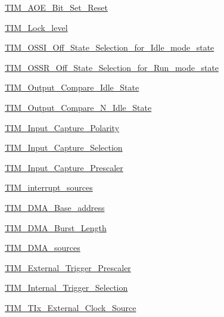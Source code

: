 \begin{DoxyCompactItemize}
\item 
\hyperlink{group___t_i_m___a_o_e___bit___set___reset}{T\+I\+M\+\_\+\+A\+O\+E\+\_\+\+Bit\+\_\+\+Set\+\_\+\+Reset}
\item 
\hyperlink{group___t_i_m___lock__level}{T\+I\+M\+\_\+\+Lock\+\_\+level}
\item 
\hyperlink{group___t_i_m___o_s_s_i___off___state___selection__for___idle__mode__state}{T\+I\+M\+\_\+\+O\+S\+S\+I\+\_\+\+Off\+\_\+\+State\+\_\+\+Selection\+\_\+for\+\_\+\+Idle\+\_\+mode\+\_\+state}
\item 
\hyperlink{group___t_i_m___o_s_s_r___off___state___selection__for___run__mode__state}{T\+I\+M\+\_\+\+O\+S\+S\+R\+\_\+\+Off\+\_\+\+State\+\_\+\+Selection\+\_\+for\+\_\+\+Run\+\_\+mode\+\_\+state}
\item 
\hyperlink{group___t_i_m___output___compare___idle___state}{T\+I\+M\+\_\+\+Output\+\_\+\+Compare\+\_\+\+Idle\+\_\+\+State}
\item 
\hyperlink{group___t_i_m___output___compare___n___idle___state}{T\+I\+M\+\_\+\+Output\+\_\+\+Compare\+\_\+\+N\+\_\+\+Idle\+\_\+\+State}
\item 
\hyperlink{group___t_i_m___input___capture___polarity}{T\+I\+M\+\_\+\+Input\+\_\+\+Capture\+\_\+\+Polarity}
\item 
\hyperlink{group___t_i_m___input___capture___selection}{T\+I\+M\+\_\+\+Input\+\_\+\+Capture\+\_\+\+Selection}
\item 
\hyperlink{group___t_i_m___input___capture___prescaler}{T\+I\+M\+\_\+\+Input\+\_\+\+Capture\+\_\+\+Prescaler}
\item 
\hyperlink{group___t_i_m__interrupt__sources}{T\+I\+M\+\_\+interrupt\+\_\+sources}
\item 
\hyperlink{group___t_i_m___d_m_a___base__address}{T\+I\+M\+\_\+\+D\+M\+A\+\_\+\+Base\+\_\+address}
\item 
\hyperlink{group___t_i_m___d_m_a___burst___length}{T\+I\+M\+\_\+\+D\+M\+A\+\_\+\+Burst\+\_\+\+Length}
\item 
\hyperlink{group___t_i_m___d_m_a__sources}{T\+I\+M\+\_\+\+D\+M\+A\+\_\+sources}
\item 
\hyperlink{group___t_i_m___external___trigger___prescaler}{T\+I\+M\+\_\+\+External\+\_\+\+Trigger\+\_\+\+Prescaler}
\item 
\hyperlink{group___t_i_m___internal___trigger___selection}{T\+I\+M\+\_\+\+Internal\+\_\+\+Trigger\+\_\+\+Selection}
\item 
\hyperlink{group___t_i_m___t_ix___external___clock___source}{T\+I\+M\+\_\+\+T\+Ix\+\_\+\+External\+\_\+\+Clock\+\_\+\+Source}

\end{DoxyCompactItemize}
